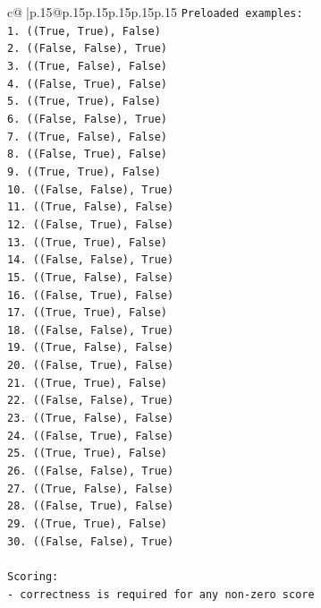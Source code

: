 \documentclass{article}
\begin{document}
{\begin{supertabular}{c@{$\;$}|p{.15\linewidth}@{}p{.15\linewidth}p{.15\linewidth}p{.15\linewidth}p{.15\linewidth}p{.15\linewidth}}
{{{\texttt{Preloaded examples:} \\
\texttt{1. ((True, True), False)} \\
\texttt{2. ((False, False), True)} \\
\texttt{3. ((True, False), False)} \\
\texttt{4. ((False, True), False)} \\
\texttt{5. ((True, True), False)} \\
\texttt{6. ((False, False), True)} \\
\texttt{7. ((True, False), False)} \\
\texttt{8. ((False, True), False)} \\
\texttt{9. ((True, True), False)} \\
\texttt{10. ((False, False), True)} \\
\texttt{11. ((True, False), False)} \\
\texttt{12. ((False, True), False)} \\
\texttt{13. ((True, True), False)} \\
\texttt{14. ((False, False), True)} \\
\texttt{15. ((True, False), False)} \\
\texttt{16. ((False, True), False)} \\
\texttt{17. ((True, True), False)} \\
\texttt{18. ((False, False), True)} \\
\texttt{19. ((True, False), False)} \\
\texttt{20. ((False, True), False)} \\
\texttt{21. ((True, True), False)} \\
\texttt{22. ((False, False), True)} \\
\texttt{23. ((True, False), False)} \\
\texttt{24. ((False, True), False)} \\
\texttt{25. ((True, True), False)} \\
\texttt{26. ((False, False), True)} \\
\texttt{27. ((True, False), False)} \\
\texttt{28. ((False, True), False)} \\
\texttt{29. ((True, True), False)} \\
\texttt{30. ((False, False), True)} \\
\\ 
\texttt{Scoring:} \\
\texttt{{-} correctness is required for any non{-}zero score} \\
}}}
\end{supertabular}}
\end{document}
